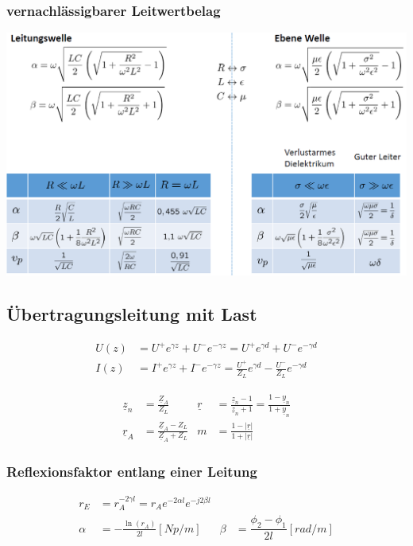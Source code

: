 \subsubsection{vernachlässigbarer Leitwertbelag}
\includegraphics[width=\columnwidth]{Figures/vernachlaessigbarerLeiterwertbelag.png}

\subsection{Übertragungsleitung mit Last}



\begin{align*}
    U(z) & = U^+ e^{\gamma z} + U^- e^{-\gamma z} = U^+ e^{\gamma d} + U^ - e^{-\gamma d}                      \\
    I(z) & = I^+ e^{\gamma z} + I^- e^{-\gamma z} = \frac{U^+}{Z_L}e^{\gamma d} - \frac{U^-}{Z_L}e^{-\gamma d}
\end{align*}

\begin{align*}
    \underline{z}_n & = \frac{\underline{Z}_A}{Z_L}                     & \underline{r} & = \frac{\underline{z}_n-1}{\underline{z}_n+1}= \frac{1-\underline{y}_n}{1+\underline{y}_n} \\
    \underline{r}_A & = \frac{\underline{Z}_A-Z_L}{\underline{Z}_A+Z_L} & m             & = \frac{1-|\underline{r}|}{1+|\underline{r}|}
\end{align*}

\subsubsection{Reflexionsfaktor entlang einer Leitung}
\begin{align*}
    r_E    & = r_A  ^{-2\gamma l} = r_A  e^{-2\alpha l} e^{-j2\beta l}                                                     \\
    \alpha & = -\frac{\ln(r_A)}{2l} [\si{Np/m}]                        & \beta & = \dfrac{\phi_2 -\phi_1}{2l} [\si{rad/m}]
\end{align*}

